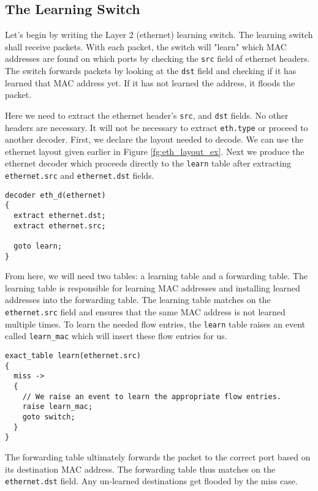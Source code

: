\subsection{The Learning Switch} \label{tut:learning_switch}

Let's begin by writing the Layer 2 (ethernet) learning switch. The learning switch shall receive packets. With each packet, the switch will "learn" which MAC addresses are found on which ports by checking the \texttt{src} field of ethernet headers. The switch forwards packets by looking at the \texttt{dst} field and checking if it has learned that MAC address yet. If it has not learned the address, it floods the packet.

Here we need to extract the ethernet header's \texttt{src}, and \texttt{dst} fields. No other headers are necessary. It will not be necessary to extract \texttt{eth.type} or proceed to another decoder. First, we declare the layout needed to decode. We can use the ethernet layout given earlier in Figure \ref{fg:eth_layout_ex}. Next we produce the ethernet decoder which proceeds directly to the \texttt{learn} table after extracting \texttt{ethernet.src} and \texttt{ethernet.dst} fields.

\begin{lstlisting}
decoder eth_d(ethernet)
{
  extract ethernet.dst;
  extract ethernet.src;
  
  goto learn;
}
\end{lstlisting}

From here, we will need two tables: a learning table and a forwarding table. The learning table is responsible for learning MAC addresses and installing learned addresses into the forwarding table. The learning table matches on the \texttt{ethernet.src} field and ensures that the same MAC address is not learned multiple times. To learn the needed flow entries, the \texttt{learn} table raises an event called \texttt{learn\_mac} which will insert these flow entries for us.

\begin{lstlisting}
exact_table learn(ethernet.src)
{
  miss ->
  {
  	// We raise an event to learn the appropriate flow entries.
  	raise learn_mac;
    goto switch;
  }
}
\end{lstlisting}

The forwarding table ultimately forwards the packet to the correct port based on its destination MAC address. The forwarding table thus matches on the \texttt{ethernet.dst} field. Any un-learned destinations get flooded by the miss case.


